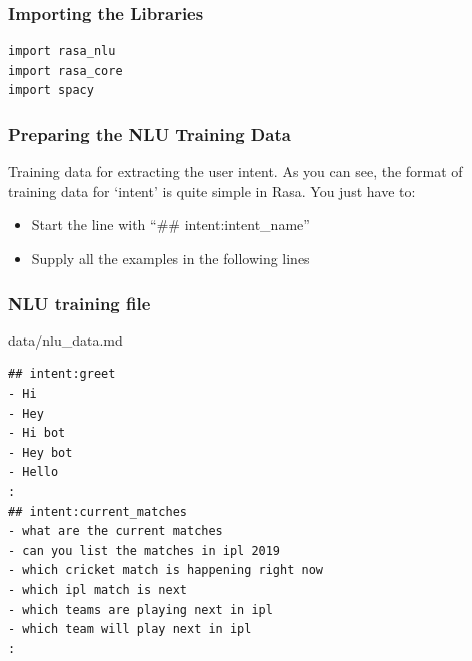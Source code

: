  \begin{frame}[fragile]\frametitle{Importing the Libraries}

\begin{lstlisting}
import rasa_nlu
import rasa_core
import spacy
\end{lstlisting}
\end{frame}






 \begin{frame}[fragile]\frametitle{Preparing the NLU Training Data}
Training data for extracting the user intent. As you can see, the format of training data for `intent' is quite simple in Rasa. You just have to:
\begin{itemize}
\item Start the line with ``\#\# intent:intent\_name''
\item Supply all the examples in the following lines
\end{itemize}

\end{frame}

 \begin{frame}[fragile]\frametitle{NLU training file}
data/nlu\_data.md

\begin{lstlisting}
## intent:greet
- Hi
- Hey
- Hi bot
- Hey bot
- Hello
:
## intent:current_matches
- what are the current matches
- can you list the matches in ipl 2019
- which cricket match is happening right now
- which ipl match is next
- which teams are playing next in ipl
- which team will play next in ipl
:
\end{lstlisting}
\end{frame}

